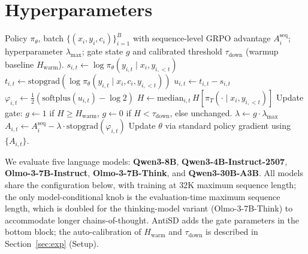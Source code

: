 \documentclass{article}
\begin{document}
\section{Hyperparameters}
\label{app:hparams}

\begin{algorithm}[h]
  \caption{Anti-Self-Distillation (AntiSD) -- one training step.}
  \label{alg:antisd}
  \begin{algorithmic}[1]
    \Require Policy $\pi_\theta$, batch $\{(x_i, y_i, c_i)\}_{i=1}^B$ with sequence-level GRPO advantage $A_i^{\mathrm{seq}}$; hyperparameter $\lambda_{\max}$; gate state $g$ and calibrated threshold $\tau_{\mathrm{down}}$ (warmup baseline $H_{\mathrm{warm}}$).
    \State $s_{i,t} \gets \log \pi_\theta(y_{i,t} \mid x_i, y_{i,<t})$ 
    \State $t_{i,t} \gets \mathrm{stopgrad}\!\left(\log \pi_\theta(y_{i,t} \mid x_i, c_i, y_{i,<t})\right)$ 
    \State $u_{i,t} \gets t_{i,t} - s_{i,t}$ \label{algline:u} 
    \State $\varphi_{i,t} \gets \tfrac{1}{2}(\mathrm{softplus}(u_{i,t}) - \log 2)$ \label{algline:phi} 
    \EndFor
    \State $H \gets \mathrm{median}_{i,t}\, H[\pi_T(\cdot \mid x_i, y_{i,<t})]$ 
    \State Update gate: $g \gets 1$ if $H \ge H_{\mathrm{warm}}$, $g \gets 0$ if $H < \tau_{\mathrm{down}}$, else unchanged.
    \State $\lambda \gets g \cdot \lambda_{\max}$ \label{algline:lambda}
    \State $A_{i,t} \gets A_i^{\mathrm{seq}} - \lambda \cdot \mathrm{stopgrad}(\varphi_{i,t})$ \label{algline:advantage} 
    \State Update $\theta$ via standard policy gradient using $\{A_{i,t}\}$.
  \end{algorithmic}
\end{algorithm}

We evaluate five language models: \textbf{Qwen3-8B}, \textbf{Qwen3-4B-Instruct-2507}, \textbf{Olmo-3-7B-Instruct}, \textbf{Olmo-3-7B-Think}, and \textbf{Qwen3-30B-A3B}. All models share the configuration below, with training at $32$K maximum sequence length; the only model-conditional knob is the evaluation-time maximum sequence length, which is doubled for the thinking-model variant (Olmo-3-7B-Think) to accommodate longer chains-of-thought. AntiSD adds the gate parameters in the bottom block; the auto-calibration of $H_{\mathrm{warm}}$ and $\tau_{\mathrm{down}}$ is described in Section~\ref{sec:exp} (Setup).
\end{document}

